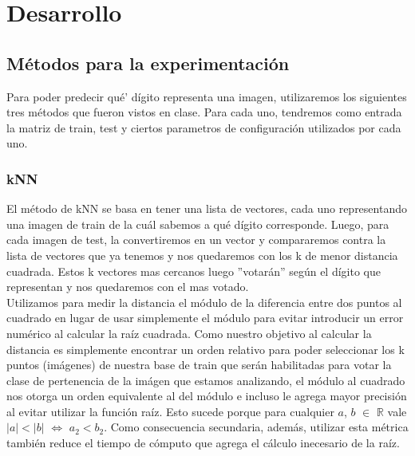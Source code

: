 \section{Desarrollo}

\subsection{M\'etodos para la experimentaci\'on}

Para poder predecir qu\'e' d\'igito representa una imagen, utilizaremos los siguientes tres m\'etodos que fueron vistos en clase. Para cada uno, tendremos como entrada la matriz de train, test y ciertos parametros de configuraci\'on utilizados por cada uno.

\subsubsection{kNN}

El m\'etodo de kNN se basa en tener una lista de vectores, cada uno representando una imagen de train de la cu\'al sabemos a qu\'e d\'igito corresponde. Luego, para cada imagen de test, la convertiremos en un vector y compararemos contra la lista de vectores que ya tenemos y nos quedaremos con los k de menor distancia cuadrada. Estos k vectores mas cercanos luego ''votar\'an'' seg\'un el d\'igito que representan y nos quedaremos con el mas votado.\\

Utilizamos para medir la distancia el m\'odulo de la diferencia entre dos puntos al cuadrado en lugar de usar simplemente el m\'odulo para evitar introducir un error numérico al calcular la raíz cuadrada. Como nuestro objetivo al calcular la distancia es simplemente encontrar un orden relativo para poder seleccionar los k puntos (imágenes) de nuestra base de train que serán habilitadas para votar la clase de pertenencia de la imágen que estamos analizando, el módulo al cuadrado nos otorga un orden equivalente al del módulo e incluso le agrega mayor precisión al evitar utilizar la función ra\'iz. Esto sucede porque para cualquier $a$, $b$ $\in$ $\mathds{R}$ vale $|a| < |b|$ $\Leftrightarrow$ $a_{2} < b_{2}$. Como consecuencia secundaria, además, utilizar esta métrica también reduce el tiempo de cómputo que agrega el cálculo inecesario de la ra\'iz.\\

